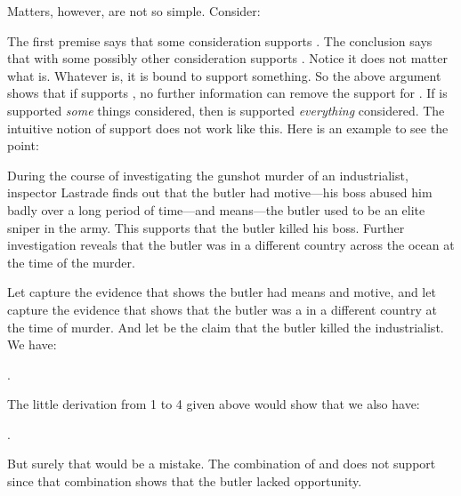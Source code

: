 Matters, however, are not so simple. Consider:

\begin{argument}
 \aitem {}
 \aitem {}
 \aitem {}
 \aitem {}
\end{argument}

The first premise says that some consideration \p{\Gamma} supports . The 
conclusion says that \p{\Gamma} with some possibly other consideration \p{\Delta} 
supports . Notice it does not matter what \p{\Delta} is. Whatever 
\p{\Delta} is, it is bound to support something. So the above argument shows 
that if \p{\Gamma} supports , no further information can remove the 
support for . If  is supported \emph{some} things considered, then 
 is supported \emph{everything} considered. The intuitive notion of 
support does not work like this.  Here is an example to see the point:

\begin{Example}\label{ex:lastrade}
During the course of investigating the gunshot murder of an industrialist, 
inspector Lastrade finds out that the butler had motive---his boss abused him 
badly over a long period of time---and means---the butler used to be an elite 
sniper in the army.  This supports that the butler killed his boss.  Further 
investigation reveals that the butler was in a different country across the 
ocean at the time of the murder.
\end{Example}

Let \p{\Gamma} capture the evidence that shows the butler had means and motive, 
and let \p{\Delta} capture the evidence that shows that the butler was a in a 
different country at the time of murder. And let  be the claim that the 
butler killed the industrialist. We have:

\begin{center}
.
\end{center}

The little derivation from 1 to 4 given above would show that we also have:

\begin{center}
.
\end{center}

But surely that would be a mistake. The combination of \p{\Gamma} and \p{\Delta} 
does not support  since that combination shows that the butler lacked 
opportunity.

